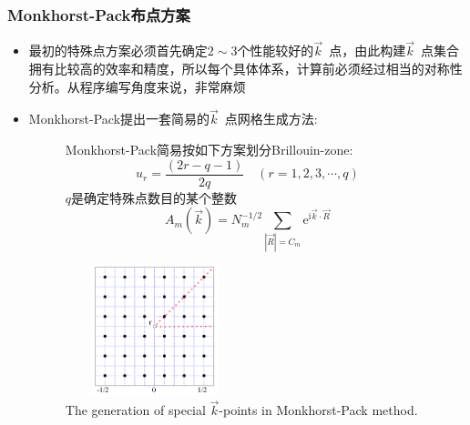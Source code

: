 \frame
{
	\frametitle{\textrm{Monkhorst-Pack}布点方案}
	\begin{itemize}
		\item 最初的特殊点方案必须首先确定$2\sim3$个性能较好的$\vec k$~点，由此构建$\vec k$~点集合拥有比较高的效率和精度，所以每个具体体系，计算前必须经过相当的对称性分析。从程序编写角度来说，非常麻烦
		\item \textrm{Monkhorst-Pack}提出一套简易的$\vec k$~点网格生成方法:

\begin{figure}[h!]
\begin{minipage}[t]{0.55\linewidth}
			\textrm{Monkhorst-Pack}简易按如下方案划分\textrm{Brillouin-zone}:
			$$\boxed{u_r=\dfrac{(2r-q-1)}{2q}\quad(r=1,2,3,\cdots,q)}$$
			$q$是确定特殊点数目的某个整数
			\vspace{-0.1in}
			$$A_m(\vec k)=N_m^{-1/2}\sum_{|\vec R|=C_m}\mathrm{e}^{\mathrm{i}\vec k\cdot\vec R}$$
\end{minipage}
\hfill
\begin{minipage}[t]{0.42\linewidth}
\centering
\vspace*{-0.6in}
\includegraphics[height=1.5in,width=2.05in,viewport=-200 0 850 800,clip]{Figures/Special-points-MP.png}
\caption{\tiny \textrm{The generation of special $\vec k$-points in \textrm{Monkhorst-Pack} method.}}%
\label{Special-points-MP}
\end{minipage}
\end{figure} 
	\end{itemize}
}

